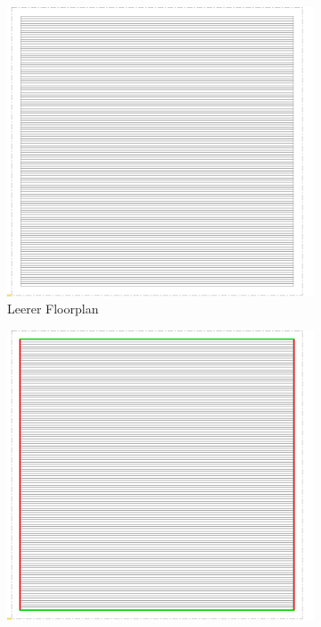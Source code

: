     \begin{figure}
        \centering
        \begin{subfigure}[b]{0.475\textwidth}
            \centering
            \includegraphics[width=\textwidth]{img/DFT_FLOORPLAN/CROPPED_IMG/FP_1.png}
            \caption{{\small Leerer Floorplan}}    
            \label{pic:floorplan1}
        \end{subfigure}
        \hfill
        \begin{subfigure}[b]{0.475\textwidth}  
            \centering 
            \includegraphics[width=\textwidth]{img/DFT_FLOORPLAN/CROPPED_IMG/FP_2.png}

\end{subfigure}
\end{figure}
